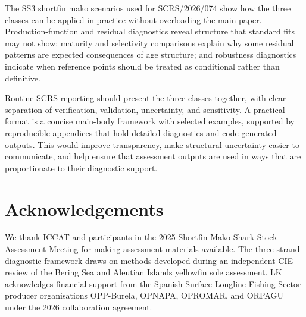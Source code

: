 \documentclass[11pt,a4paper]{article}
\begin{document}
The SS3 shortfin mako scenarios used for SCRS/2026/074 show how the three classes can be applied in practice without overloading the main paper. Production-function and residual diagnostics reveal structure that standard fits may not show; maturity and selectivity comparisons explain why some residual patterns are expected consequences of age structure; and robustness diagnostics indicate when reference points should be treated as conditional rather than definitive.

Routine SCRS reporting should present the three classes together, with clear separation of verification, validation, uncertainty, and sensitivity. A practical format is a concise main-body framework with selected examples, supported by reproducible appendices that hold detailed diagnostics and code-generated outputs. This would improve transparency, make structural uncertainty easier to communicate, and help ensure that assessment outputs are used in ways that are proportionate to their diagnostic support.

\section*{Acknowledgements}

We thank ICCAT and participants in the 2025 Shortfin Mako Shark Stock Assessment Meeting for making assessment materials available. The three-strand diagnostic framework draws on methods developed during an independent CIE review of the Bering Sea and Aleutian Islands yellowfin sole assessment. LK acknowledges financial support from the Spanish Surface Longline Fishing Sector producer organisations OPP-Burela, OPNAPA, OPROMAR, and ORPAGU under the 2026 collaboration agreement.

\appendix






\end{document}
